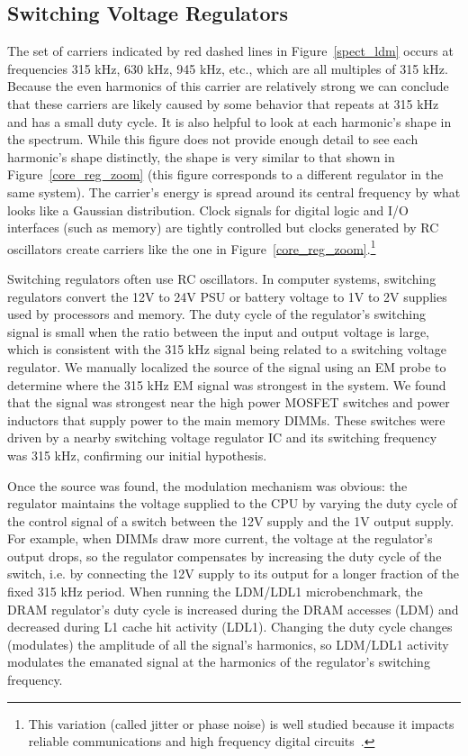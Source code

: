 \subsection{Switching Voltage Regulators}
\label{sec:regulators}

The set of carriers indicated by red dashed lines in Figure~\ref{spect_ldm} occurs at frequencies 315 kHz, 630 kHz, 945 kHz, etc., which are all multiples of 315 kHz. Because the even harmonics of this carrier are relatively strong we can conclude that these carriers are likely caused by some behavior that repeats at 315 kHz and has a small duty cycle. It is also helpful to look at each harmonic's shape in the spectrum. While this figure does not provide enough detail to see each harmonic's shape distinctly, the shape is very similar to that shown in Figure~\ref{core_reg_zoom} (this figure corresponds to a different regulator in the same system). The carrier's energy is spread around its central frequency by what looks like a Gaussian distribution. Clock signals for digital logic and I/O interfaces (such as memory) are tightly controlled but clocks generated by RC oscillators create carriers like the one in Figure~\ref{core_reg_zoom}.\footnote{This variation (called jitter or phase noise) is well studied because it impacts reliable communications and high frequency digital circuits~\cite{hajimiri_1998,trischitta_1989}.} 

Switching regulators often use RC oscillators. In computer systems, switching regulators convert the 12V to 24V PSU or battery voltage to 1V to 2V supplies used by processors and memory. The duty cycle of the regulator's switching signal is small when the ratio between the input and output voltage is large, which is consistent with the 315 kHz signal being related to a switching voltage regulator. We manually localized the source of the signal using an EM probe to determine where the 315 kHz EM signal was strongest in the system. We found that the signal was strongest near the high power MOSFET switches and power inductors that supply power to the main memory DIMMs. These switches were driven by a nearby switching voltage regulator IC and its switching frequency was 315 kHz, confirming our initial hypothesis. 

Once the source was found, the modulation mechanism was obvious: the regulator maintains the voltage supplied to the CPU by varying the duty cycle of the control signal of a switch between the 12V supply and the 1V output supply. For example, when DIMMs draw more current, the voltage at the regulator's output drops, so the regulator compensates by increasing the duty cycle of the switch, i.e. by connecting the 12V supply to its output for a longer fraction of the fixed 315 kHz period. When running the LDM/LDL1 microbenchmark, the DRAM regulator's duty cycle is increased during the DRAM accesses (LDM) and decreased during L1 cache hit activity (LDL1). Changing the duty cycle changes (modulates) the amplitude of all the signal's harmonics, so LDM/LDL1 activity modulates the emanated signal at the harmonics of the regulator's switching frequency.

